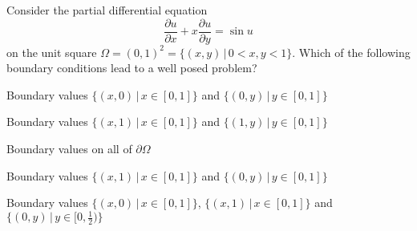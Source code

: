 Consider the partial differential equation
\[
\frac{\partial u}{\partial x}
+x
\frac{\partial u}{\partial y}
=
\sin u
\]
on the unit square
$\Omega=(0,1)^2=\{(x,y)\,|\, 0<x,y<1\}$.
Which of the following boundary conditions lead to a well posed
problem?
\begin{teilaufgaben}
\item
Boundary values $\{(x,0)\,|\,x\in [0,1]\}$ and $\{(0,y)\,|\,y\in[0,1]\}$
\item
Boundary values $\{(x,1)\,|\,x\in [0,1]\}$ and $\{(1,y)\,|\,y\in[0,1]\}$
\item
Boundary values on all of $\partial\Omega$
\item
Boundary values $\{(x,1)\,|\,x\in [0,1]\}$ and $\{(0,y)\,|\,y\in[0,1]\}$
\item
Boundary values
$\{(x,0)\,|\,x\in [0,1]\}$,
$\{(x,1)\,|\,x\in [0,1]\}$ and 
$\{(0,y)\,|\,y\in[0,\frac12)\}$
\end{teilaufgaben}

